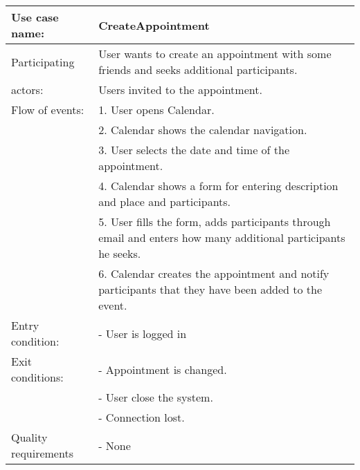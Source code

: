 {\tabulinesep=1.2mm
\begin{tabu}{ | p{3cm} | p{13cm} |}
    \hline
    Use case name: 			& 		CreateAppointment\\ \hline
    Participating  			& 		User wants to create an appointment with some friends and seeks additional participants. \\
    actors:					&		Users invited to the appointment.\\ \hline
    Flow of events: 		& 		1. User opens Calendar. \\
							&		2. Calendar shows the calendar navigation.\\
							&		3. User selects the date and time of the appointment.\\
							&		4. Calendar shows a form for entering description and place and participants.\\
							&		5. User fills the form, adds participants through email and enters how many additional participants he seeks.\\
							&		6. Calendar creates the appointment and notify participants that they have been added to the event.\\ \hline
    Entry condition: 		& 		- User is logged in  \\ \hline
	Exit conditions: 		&		- Appointment is changed.\\
							&		- User close the system.\\
							&		- Connection lost.\\\hline
	Quality requirements	&	 	- None \\\hline
\end{tabu}
}